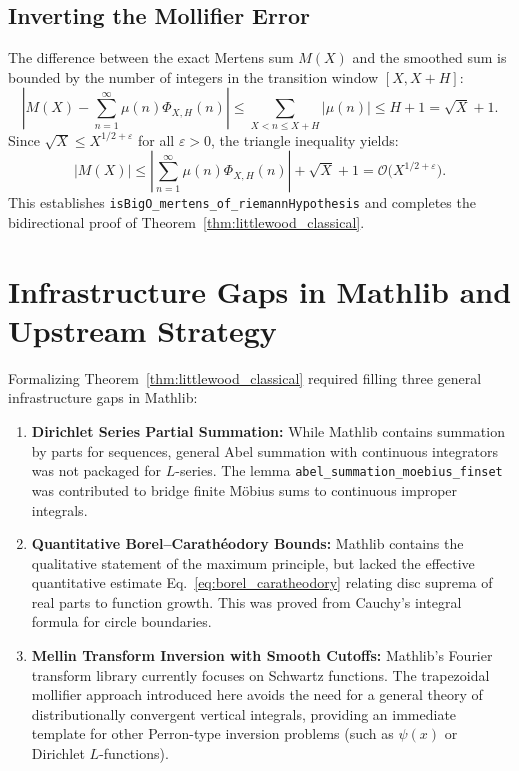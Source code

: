 \documentclass[11pt,a4paper]{article}
\theoremstyle{definition}
\begin{document}
\subsection{Inverting the Mollifier Error}
The difference between the exact Mertens sum $M(X)$ and the smoothed sum is bounded by the number of integers in the transition window $[X, X+H]$:
\begin{equation}
\label{eq:mollifier_error}
\left| M(X) - \sum_{n=1}^\infty \mu(n) \Phi_{X,H}(n) \right| \le \sum_{X < n \le X+H} |\mu(n)| \le H + 1 = \sqrt{X} + 1.
\end{equation}
Since $\sqrt{X} \le X^{1/2+\varepsilon}$ for all $\varepsilon > 0$, the triangle inequality yields:
\begin{equation}
|M(X)| \le \left|\sum_{n=1}^\infty \mu(n) \Phi_{X,H}(n)\right| + \sqrt{X} + 1 = \mathcal{O}\bigl(X^{1/2+\varepsilon}\bigr).
\end{equation}
This establishes \texttt{isBigO\_mertens\_of\_riemannHypothesis} and completes the bidirectional proof of Theorem~\ref{thm:littlewood_classical}.

\section{Infrastructure Gaps in Mathlib and Upstream Strategy}
\label{sec:upstream}

Formalizing Theorem~\ref{thm:littlewood_classical} required filling three general infrastructure gaps in Mathlib:

\begin{enumerate}[label=(\alph*),leftmargin=1.8em]
  \item \textbf{Dirichlet Series Partial Summation:} While Mathlib contains summation by parts for sequences, general Abel summation with continuous integrators was not packaged for $L$-series. The lemma \texttt{abel\_summation\_moebius\_finset} was contributed to bridge finite M\"obius sums to continuous improper integrals.
  \item \textbf{Quantitative Borel--Carath\'eodory Bounds:} Mathlib contains the qualitative statement of the maximum principle, but lacked the effective quantitative estimate Eq.~\eqref{eq:borel_caratheodory} relating disc suprema of real parts to function growth. This was proved from Cauchy's integral formula for circle boundaries.
  \item \textbf{Mellin Transform Inversion with Smooth Cutoffs:} Mathlib's Fourier transform library currently focuses on Schwartz functions. The trapezoidal mollifier approach introduced here avoids the need for a general theory of distributionally convergent vertical integrals, providing an immediate template for other Perron-type inversion problems (such as $\psi(x)$ or Dirichlet $L$-functions).
\end{enumerate}
\end{document}
